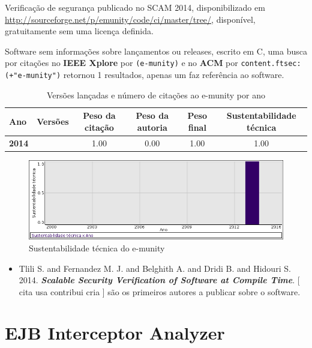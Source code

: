 Verificação de segurança
publicado no SCAM 2014,
disponibilizado em \url{http://sourceforge.net/p/emunity/code/ci/master/tree/},
disponível,
gratuitamente
sem uma licença definida.

Software sem informações sobre lançamentos ou releases,
escrito em C,
uma busca por citações no {\bf IEEE Xplore} por
\texttt{(e-munity)}
e no {\bf ACM} por
\texttt{content.ftsec:(+"e-munity")}
retornou
1 resultados,
apenas um faz referência ao software.


\begin{table}[H]
\caption{Versões lançadas e número de citações ao e-munity por ano}
\centering
\begin{tabular}{| l | c | c | c | c | c |}
  \hline
  Ano & Versões & Peso da citação & Peso da autoria & Peso final & Sustentabilidade técnica \\
  \hline
            {\bf 2014}
          &
          
          &
          1.00
          &
          0.00
          &
          1.00
          &
            {\color{blue} 1.00}
          \\
\hline
\end{tabular}
\end{table}

\begin{figure}[h]
  \center
  \includegraphics[scale=0.50]{imagens/softwares-charts/e-munity.png}
  \caption{Sustentabilidade técnica do e-munity}
\end{figure}


\begin{itemize}
\item Tlili S. and Fernandez M. J. and Belghith A. and Dridi B. and Hidouri S.
      2014.
        \textbf{\textit{ Scalable Security Verification of Software at Compile Time}}.
      [
          cita
          usa
          contribui
          cria
      ]
são os primeiros autores a publicar sobre o software.
\end{itemize}
\section{EJB Interceptor Analyzer}

